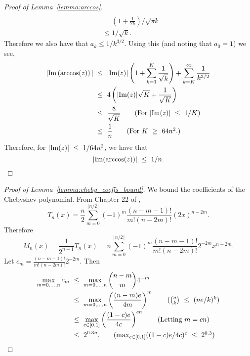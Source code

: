 \begin{proof}[Proof of Lemma~\ref{lemma:arccos}]
\begin{align*}
    \\
    & = \left( 1 + \frac{1}{2k} \right)/\sqrt{ \pi k}   \\
    & \leq 1/\sqrt{k}.
\end{align*}
Therefore we also have that $a_k \leq 1/k^{3/2}$. Using this (and noting that $a_0 = 1$) we see,
 \begin{align*}
         \abs{ \mathrm{Im} \left( \arccos(z) \right)  } & \leq \abs{\mathrm{Im}(z)} \left( 1 + \sum_{k =1}^K \frac{1}{\sqrt{k}} \right) + \sum_{k = K}^{\infty} \frac{1}{k^{3/2}} \\
         & \leq 4 \left( \abs{\mathrm{Im}(z)} \sqrt{K} + \frac{1}{\sqrt{K}} \right) \\
         & \leq \frac{8}{\sqrt{K}} \tag{For $\abs{\mathrm{Im}(z)}\leq 1/K$} \\
         & \leq \frac{1}{n} \tag{For $K \geq 64 n^2$.}
         \end{align*}
         Therefore, for $|\mathrm{Im}(z)| ~\le~ 1/64n^2$, we have that
         \begin{equation*}
             |\mathrm{Im} ( \arccos (z) ) | ~\le~ 1/n.
         \end{equation*}
\end{proof}

\begin{proof}[Proof of Lemma~\ref{lemma:cheby_coeffs_bound}]
We bound the coefficients of the Chebyshev polynomial. From Chapter 22 of \cite{abramowitz1948handbook},
\begin{equation}
\label{eqn:coefficients_cheby}
    T_n(x) = \frac{n}{2} \sum_{m=0}^{\lfloor n/2 \rfloor} (-1)^m \frac{(n-m-1)!}{m!(n-2m)!} (2x)^{n-2m}.
\end{equation}
Therefore
\begin{equation*}
    M_n(x) = \frac{1}{2^{n-1}} T_n(x) = n \sum_{m=0}^{\lfloor n/2 \rfloor} (-1)^m \frac{(n-m-1)!}{m!(n-2m)!} 2^{-2m} x^{n-2m}.
\end{equation*}
Let $c_m = \frac{(n-m-1)!}{m!(n-2m)!} 2^{-2m}$. Then
\begin{align*}
    \max_{m = 0, \dots, n} c_m & \leq \max_{m = 0, \dots, n}  {n-m \choose m} 4^{-m} \\
    & \leq \max_{m = 0, \dots, n} \left( \frac{(n-m)e}{4m}\right)^m \tag{${n \choose k }\leq (ne/k)^k$} \\
    & \leq \max_{c \in [0,1]} \left( \frac{(1-c)e}{4c}\right)^{cn} \tag{Letting $m = cn$} \\
    & \leq 2^{0.3n}. \tag{$\max_{c \in [0,1]} ((1-c)e/4c)^c \leq 2^{0.3}$}
\end{align*}
\end{proof}